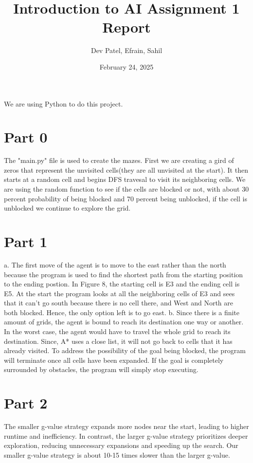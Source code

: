 \documentclass[12pt]{article}
\title{Introduction to AI Assignment 1 Report}
\author{Dev Patel, Efrain, Sahil}
\date{February 24, 2025}
\begin{document}
\maketitle

\newpage
We are using Python to do this project.
\section*{Part 0}
        The "main.py" file is used to create the mazes. First we are creating a gird of zeros that represent the unvisited cells(they are all unvisited at the start). It then starts at a random cell and begins DFS travesal to visit its neighboring cells.
    We are using the random function to see if the cells are blocked or not, with about 30 percent probability of being blocked and 70 percent being unblocked, if the cell is unblocked we continue to explore the grid. 

\section*{Part 1}
        a. The first move of the agent is to move to the east rather than the north because the program is used to find the shortest path from the starting position to the ending postion. In Figure 8, the starting cell is E3 and the ending cell is E5. At the start the program looks at all the neighboring cells of E3 and sees that it can't go south because there is no cell there, and West and North are both blocked. Hence, the only option left is to go east.  
    \newline
    \newline
        b. Since there is a finite amount of grids, the agent is bound to reach its destination one way or another. In the worst case, the agent would have to travel the whole grid to reach its destination. Since, A* uses a close list, it will not go back to cells that it has already visited. To address the possibility of the goal being blocked, the program will terminate once all cells have been expanded. If the goal is completely surrounded by obstacles, the program will simply stop executing.

\section*{Part 2}
The smaller g-value strategy expands more nodes near the start, leading to higher runtime and inefficiency. In contrast, the larger g-value strategy prioritizes deeper exploration, reducing unnecessary expansions and speeding up the search. Our smaller g-value strategy is about 10-15 times slower than the larger g-value.
\end{document}
